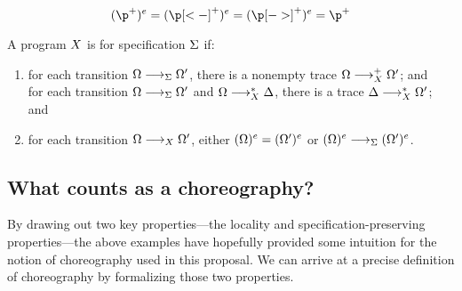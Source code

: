 


\begin{equation*}
  \erase{\p^+} = \erase{\p[<-]^+} = \erase{\p[->]^+} = \p^+
\end{equation*}

\begin{definition}
  A program $X$ is  for specification $\Sigma$ if:
  \begin{enumerate}
  \item\label{def:spec-pres-1}
    for each transition $\octx \trans_{\spec} \octx'$, there is a nonempty trace $\octx \trans+_{\chor} \octx'$; and\\
    for each transition $\octx \trans_{\spec} \octx'$ and $\octx \trans*_{\chor} \lctx$, there is a trace $\lctx \trans*_{\chor} \octx'$; and
  \item\label{def:spec-pres-2}
    for each transition $\octx \trans_{\chor} \octx'$, either $(\Omega)^e = (\Omega')^e$ or $\erase{\octx} \trans_{\spec} \erase{\octx'}$.
  \end{enumerate}
\end{definition}



\subsection{What counts as a choreography?}\label{sec:what-counts-choreo}



By drawing out two key properties---the locality and specification-preserving properties---the above examples have hopefully provided some intuition for the notion of choreography used in this proposal.
We can arrive at a precise definition of choreography by formalizing those two properties.

